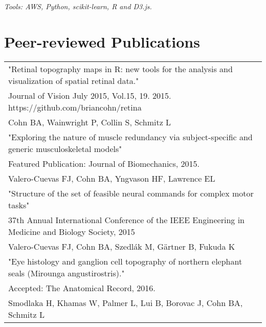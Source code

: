 \documentclass[10pt,a4paper]{article}
\begin{document}
  \vspace*{2mm}\setlength\parindent{2mm}\begin{minipage}{16.8cm}
    \textit{Tools: AWS, Python, scikit-learn, R and D3.js.} 
  \end{minipage}

  \vspace*{3mm}\section*{Peer-reviewed Publications}

  \vspace*{1mm}\begin{tabularx}{17cm}{X}



    "Retinal topography maps in R: new tools for the analysis and visualization of spatial retinal data." \\
    Journal of Vision July 2015, Vol.15, 19.  2015. https://github.com/briancohn/retina \\
    Cohn BA, Wainwright P, Collin S, Schmitz L \\[2mm]

    "Exploring the nature of muscle redundancy via subject-specific and generic musculoskeletal models" \\
    Featured Publication: Journal of Biomechanics, 2015. \\
    Valero-Cuevas FJ, Cohn BA, Yngvason HF, Lawrence EL \\[2mm]

    "Structure of the set of feasible neural commands for complex motor tasks" \\
    37th Annual International Conference of the IEEE Engineering in Medicine and Biology Society, 2015 \\
    Valero-Cuevas FJ, Cohn BA, Szedl\'{a}k M, G{\"a}rtner B, Fukuda K \\[2mm]

    "Eye histology and ganglion cell topography of northern elephant seals (Mirounga angustirostris)." \\
    Accepted: The Anatomical Record, 2016. \\
    Smodlaka H, Khamas W, Palmer L, Lui B, Borovac J, Cohn BA, Schmitz L \\[2mm]
    
  \end{tabularx}
\end{document}
